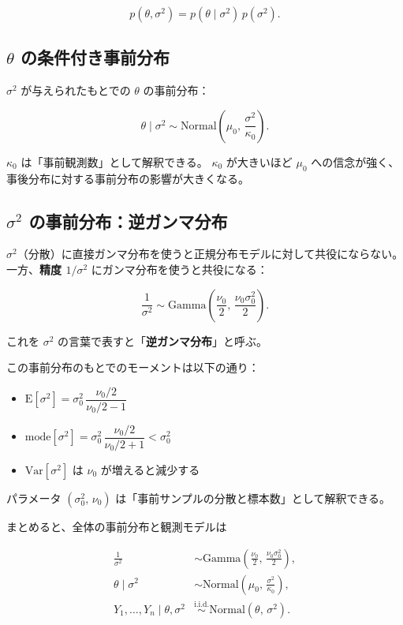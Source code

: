 \documentclass[12pt,a4paper]{ltjsarticle}
\begin{document}
\[
  p(\theta, \sigma^2) = p(\theta \mid \sigma^2)\, p(\sigma^2).
\]

\subsection{$\theta$ の条件付き事前分布}

$\sigma^2$ が与えられたもとでの $\theta$ の事前分布：

\[
  \theta \mid \sigma^2 \sim \mathrm{Normal}\!\left(\mu_0,\, \frac{\sigma^2}{\kappa_0}\right).
\]

$\kappa_0$ は「事前観測数」として解釈できる。
$\kappa_0$ が大きいほど $\mu_0$ への信念が強く、事後分布に対する事前分布の影響が大きくなる。

\subsection{$\sigma^2$ の事前分布：逆ガンマ分布}

$\sigma^2$（分散）に直接ガンマ分布を使うと正規分布モデルに対して共役にならない。
一方、\textbf{精度 $1/\sigma^2$} にガンマ分布を使うと共役になる：

\[
  \frac{1}{\sigma^2} \sim \mathrm{Gamma}\!\left(\frac{\nu_0}{2},\, \frac{\nu_0 \sigma_0^2}{2}\right).
\]

これを $\sigma^2$ の言葉で表すと「\textbf{逆ガンマ分布}」と呼ぶ。

この事前分布のもとでのモーメントは以下の通り：
\begin{itemize}
  \item $\mathrm{E}[\sigma^2] = \sigma_0^2\, \dfrac{\nu_0/2}{\nu_0/2 - 1}$
  \item $\mathrm{mode}[\sigma^2] = \sigma_0^2\, \dfrac{\nu_0/2}{\nu_0/2 + 1} < \sigma_0^2$
  \item $\mathrm{Var}[\sigma^2]$ は $\nu_0$ が増えると減少する
\end{itemize}

パラメータ $(\sigma_0^2,\, \nu_0)$ は「事前サンプルの分散と標本数」として解釈できる。

\bigskip
まとめると、全体の事前分布と観測モデルは

\begin{align*}
  \frac{1}{\sigma^2} &\sim \mathrm{Gamma}\!\left(\frac{\nu_0}{2},\, \frac{\nu_0\sigma_0^2}{2}\right), \\
  \theta \mid \sigma^2 &\sim \mathrm{Normal}\!\left(\mu_0,\, \frac{\sigma^2}{\kappa_0}\right), \\
  Y_1, \ldots, Y_n \mid \theta, \sigma^2 &\overset{\mathrm{i.i.d.}}{\sim} \mathrm{Normal}(\theta,\, \sigma^2).
\end{align*}
\end{document}
